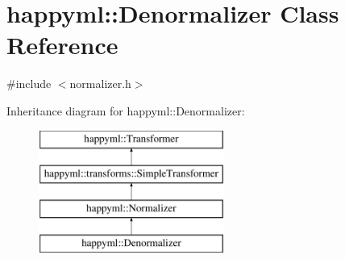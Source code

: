 \hypertarget{classhappyml_1_1Denormalizer}{}\section{happyml\+:\+:Denormalizer Class Reference}
\label{classhappyml_1_1Denormalizer}


{\ttfamily \#include $<$normalizer.\+h$>$}

Inheritance diagram for happyml\+:\+:Denormalizer\+:\begin{figure}[H]
\begin{center}
\leavevmode
\includegraphics[height=4.000000cm]{classhappyml_1_1Denormalizer}
\end{center}
\end{figure}
